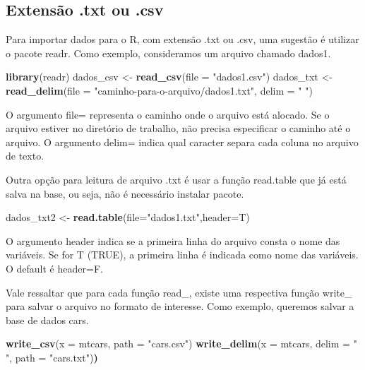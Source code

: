 \documentclass[
]{book}
\newenvironment{Shaded}{\begin{snugshade}}{\end{snugshade}}
\newcommand{\DataTypeTok}[1]{\textcolor[rgb]{0.13,0.29,0.53}{#1}}
\newcommand{\ErrorTok}[1]{\textcolor[rgb]{0.64,0.00,0.00}{\textbf{#1}}}
\newcommand{\KeywordTok}[1]{\textcolor[rgb]{0.13,0.29,0.53}{\textbf{#1}}}
\newcommand{\NormalTok}[1]{#1}
\newcommand{\StringTok}[1]{\textcolor[rgb]{0.31,0.60,0.02}{#1}}
\begin{document}
\hypertarget{extensuxe3o-.txt-ou-.csv}{%
\subsection{Extensão .txt ou .csv}\label{extensuxe3o-.txt-ou-.csv}}

Para importar dados para o R, com extensão .txt ou .csv, uma sugestão é utilizar o pacote readr. Como exemplo, consideramos um arquivo chamado dados1.

\begin{Shaded}
\begin{Highlighting}[]
\KeywordTok{library}\NormalTok{(readr)}
\NormalTok{dados_csv <-}\StringTok{ }\KeywordTok{read_csv}\NormalTok{(}\DataTypeTok{file =} \StringTok{"dados1.csv"}\NormalTok{)}
\NormalTok{dados_txt <-}\StringTok{ }\KeywordTok{read_delim}\NormalTok{(}\DataTypeTok{file =} \StringTok{"caminho-para-o-arquivo/dados1.txt"}\NormalTok{, }\DataTypeTok{delim =} \StringTok{" "}\NormalTok{)}
\end{Highlighting}
\end{Shaded}

O argumento file= representa o caminho onde o arquivo está alocado. Se o arquivo estiver no diretório de trabalho, não precisa especificar o caminho até o arquivo. O argumento delim= indica qual caracter separa cada coluna no arquivo de texto.

Outra opção para leitura de arquivo .txt é usar a função read.table que já está salva na base, ou seja, não é necessário instalar pacote.

\begin{Shaded}
\begin{Highlighting}[]
\NormalTok{dados_txt2 <-}\StringTok{ }\KeywordTok{read.table}\NormalTok{(}\DataTypeTok{file=}\StringTok{"dados1.txt"}\NormalTok{,}\DataTypeTok{header=}\NormalTok{T)}
\end{Highlighting}
\end{Shaded}

O argumento header indica se a primeira linha do arquivo consta o nome das variáveis. Se for T (TRUE), a primeira linha é indicada como nome das variáveis. O default é header=F.

Vale ressaltar que para cada função read\_, existe uma respectiva função write\_ para salvar o arquivo no formato de interesse. Como exemplo, queremos salvar a base de dados cars.

\begin{Shaded}
\begin{Highlighting}[]
\KeywordTok{write_csv}\NormalTok{(}\DataTypeTok{x =}\NormalTok{ mtcars, }\DataTypeTok{path =} \StringTok{"cars.csv"}\NormalTok{)}
\KeywordTok{write_delim}\NormalTok{(}\DataTypeTok{x =}\NormalTok{ mtcars, }\DataTypeTok{delim =} \StringTok{" "}\NormalTok{, }\DataTypeTok{path =} \StringTok{"cars.txt"}\NormalTok{)}\ErrorTok{)}
\end{Highlighting}
\end{Shaded}
\end{document}
